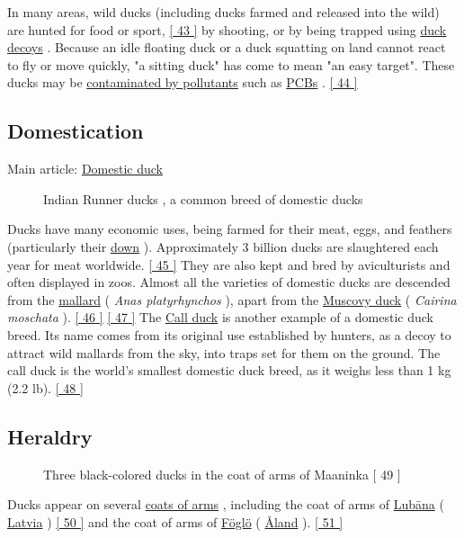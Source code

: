 \documentclass[11pt,a4paper]{article}
\begin{document}
In many areas, wild ducks (including ducks farmed and released into the wild) are hunted for food or sport, \href{\#cite\_note-43}{[ 43 ]} by shooting, or by being trapped using \href{/wiki/Duck\_decoy\_(structure)}{duck decoys} . Because an idle floating duck or a duck squatting on land cannot react to fly or move quickly, "a sitting duck" has come to mean "an easy target". These ducks may be \href{/wiki/Duck\_(food)\#Pollution}{contaminated by pollutants} such as \href{/wiki/Polychlorinated\_biphenyl}{PCBs} . \href{\#cite\_note-44}{[ 44 ]}

\subsection{Domestication}

Main article: \href{/wiki/Domestic\_duck}{Domestic duck}

\begin{figure}[h]
\caption{Indian Runner ducks , a common breed of domestic ducks}
\end{figure}

Ducks have many economic uses, being farmed for their meat, eggs, and feathers (particularly their \href{/wiki/Down\_feather}{down} ). Approximately 3 billion ducks are slaughtered each year for meat worldwide. \href{\#cite\_note-45}{[ 45 ]} They are also kept and bred by aviculturists and often displayed in zoos. Almost all the varieties of domestic ducks are descended from the \href{/wiki/Mallard}{mallard} ( \textit{Anas platyrhynchos} ), apart from the \href{/wiki/Muscovy\_duck}{Muscovy duck} ( \textit{Cairina moschata} ). \href{\#cite\_note-46}{[ 46 ]} \href{\#cite\_note-47}{[ 47 ]} The \href{/wiki/Call\_duck}{Call duck} is another example of a domestic duck breed. Its name comes from its original use established by hunters, as a decoy to attract wild mallards from the sky, into traps set for them on the ground. The call duck is the world's smallest domestic duck breed, as it weighs less than 1 kg (2.2 lb). \href{\#cite\_note-48}{[ 48 ]}

\subsection{Heraldry}

\begin{figure}[h]
\caption{Three black-colored ducks in the coat of arms of Maaninka [ 49 ]}
\end{figure}

Ducks appear on several \href{/wiki/Coats\_of\_arms}{coats of arms} , including the coat of arms of \href{/wiki/Lub\%C4\%81na}{Lubāna} ( \href{/wiki/Latvia}{Latvia} ) \href{\#cite\_note-50}{[ 50 ]} and the coat of arms of \href{/wiki/F\%C3\%B6gl\%C3\%B6}{Föglö} ( \href{/wiki/\%C3\%85land}{Åland} ). \href{\#cite\_note-51}{[ 51 ]}
\end{document}
